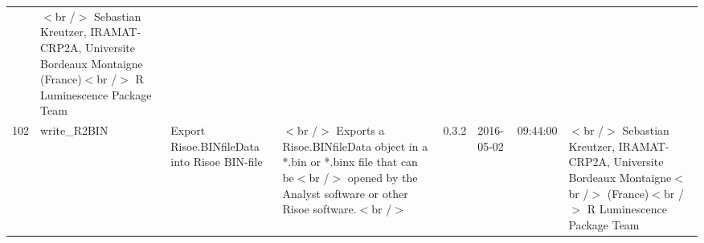\begin{table}[ht]
\begin{tabular}{rlllllll}
 & $<$br /$>$ Sebastian Kreutzer, IRAMAT-CRP2A, Universite Bordeaux Montaigne (France)$<$br /$>$  R Luminescence Package Team \\ 
  102 & write\_R2BIN & Export Risoe.BINfileData into Risoe BIN-file & $<$br /$>$ Exports a Risoe.BINfileData object in a *.bin or *.binx file that can be$<$br /$>$ opened by the Analyst software or other Risoe software.$<$br /$>$ & 0.3.2 & 2016-05-02 & 09:44:00
 & $<$br /$>$ Sebastian Kreutzer, IRAMAT-CRP2A, Universite Bordeaux Montaigne$<$br /$>$ (France)$<$br /$>$  R Luminescence Package Team \\ 
   \hline
\end{tabular}
\end{table}

